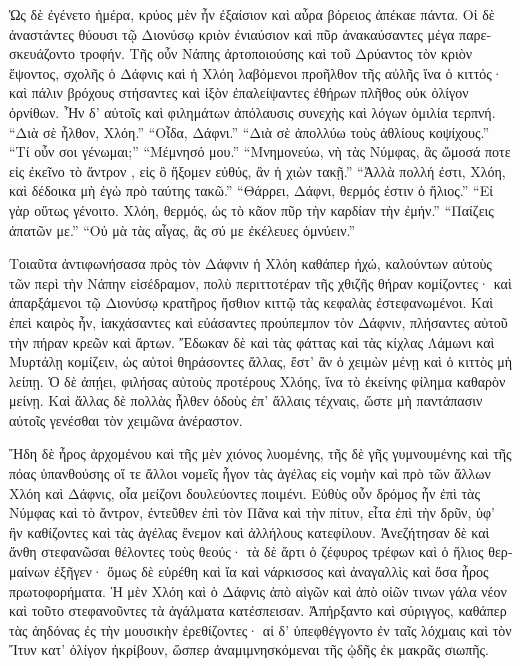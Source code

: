 \documentclass{book}
\begin{document}
\begin{pairs}
\begin{Leftside}
\begin{greek}
  Ὡς δὲ ἐγένετο ἡμέρα, κρύος μὲν ἦν ἐξαίσιον καὶ αὖρα βόρειος ἀπέκαε πάντα. Οἱ δὲ ἀναστάντες θύουσι τῷ Διονύσῳ κριὸν ἐνιαύσιον καὶ πῦρ ἀνακαύσαντες μέγα παρεσκευάζοντο τροφήν.  Τῆς οὖν Νάπης ἀρτοποιούσης καὶ τοῦ Δρύαντος τὸν κριὸν ἕψοντος, σχολῆς ὁ Δάφνις καὶ ἡ Χλόη λαβόμενοι προῆλθον τῆς αὐλῆς ἵνα ὁ κιττός· καὶ πάλιν βρόχους στήσαντες καὶ ἰξὸν ἐπαλείψαντες ἐθήρων πλῆθος οὐκ ὀλίγον ὀρνίθων.  Ἦν δ’ αὐτοῖς καὶ φιλημάτων ἀπόλαυσις συνεχὴς καὶ λόγων ὁμιλία τερπνή. “Διὰ σὲ ἦλθον, Χλόη.” “Οἶδα, Δάφνι.” “Διὰ σὲ ἀπολλύω τοὺς ἀθλίους κοψίχους.” “Τί οὖν σοι γένωμαι;” “Μέμνησό μου.” “Μνημονεύω, νὴ τὰς Νύμφας, ἃς ὤμοσά ποτε εἰς ἐκεῖνο τὸ ἄντρον , εἰς ὃ ἥξομεν εὐθύς, ἂν ἡ χιὼν τακῇ.”  “Ἀλλὰ πολλή ἐστι, Χλόη, καὶ δέδοικα μὴ ἐγὼ πρὸ ταύτης τακῶ.” “Θάρρει, Δάφνι, θερμός ἐστιν ὁ ἥλιος.” “Εἰ γὰρ οὕτως γένοιτο. Χλόη, θερμός, ὡς τὸ κᾶον πῦρ τὴν καρδίαν τὴν ἐμήν.” “Παίζεις ἀπατῶν με.” “Οὐ μὰ τὰς αἶγας, ἃς σύ με ἐκέλευες ὀμνύειν.”
\pend


  Τοιαῦτα ἀντιφωνήσασα πρὸς τὸν Δάφνιν ἡ Χλόη καθάπερ ἠχώ, καλούντων αὐτοὺς τῶν περὶ τὴν Νάπην εἰσέδραμον, πολὺ περιττοτέραν τῆς χθιζῆς θήραν κομίζοντες· καὶ ἀπαρξάμενοι τῷ Διονύσῳ κρατῆρος ἤσθιον κιττῷ τὰς κεφαλὰς ἐστεφανωμένοι.  Καὶ ἐπεὶ καιρὸς ἦν, ἰακχάσαντες καὶ εὐάσαντες προύπεμπον τὸν Δάφνιν, πλήσαντες αὐτοῦ τὴν πήραν κρεῶν καὶ ἄρτων. Ἔδωκαν δὲ καὶ τὰς φάττας καὶ τὰς κίχλας Λάμωνι καὶ Μυρτάλῃ κομίζειν, ὡς αὐτοὶ θηράσοντες ἄλλας, ἔστ’ ἂν ὁ χειμὼν μένῃ καὶ ὁ κιττὸς μὴ λείπῃ.  Ὁ δὲ ἀπῄει, φιλήσας αὐτοὺς προτέρους Χλόης, ἵνα τὸ ἐκείνης φίλημα καθαρὸν μείνῃ. Καὶ ἄλλας δὲ πολλὰς ἦλθεν ὁδοὺς ἐπ’ ἄλλαις τέχναις, ὥστε μὴ παντάπασιν αὐτοῖς γενέσθαι τὸν χειμῶνα ἀνέραστον.
\pend


  Ἤδη δὲ ἦρος ἀρχομένου καὶ τῆς μὲν χιόνος λυομένης, τῆς δὲ γῆς γυμνουμένης καὶ τῆς πόας ὑπανθούσης οἵ τε ἄλλοι νομεῖς ἦγον τὰς ἀγέλας εἰς νομὴν καὶ πρὸ τῶν ἄλλων Χλόη καὶ Δάφνις, οἷα μείζονι δουλεύοντες ποιμένι.  Εὐθὺς οὖν δρόμος ἦν ἐπὶ τὰς Νύμφας καὶ τὸ ἄντρον, ἐντεῦθεν ἐπὶ τὸν Πᾶνα καὶ τὴν πίτυν, εἶτα ἐπὶ τὴν δρῦν, ὑφ’ ἣν καθίζοντες καὶ τὰς ἀγέλας ἔνεμον καὶ ἀλλήλους κατεφίλουν. Ἀνεζήτησαν δὲ καὶ ἄνθη στεφανῶσαι θέλοντες τοὺς θεούς· τὰ δὲ ἄρτι ὁ ζέφυρος τρέφων καὶ ὁ ἥλιος θερμαίνων ἐξῆγεν· ὅμως δὲ εὑρέθη καὶ ἴα καὶ νάρκισσος καὶ ἀναγαλλὶς καὶ ὅσα ἦρος πρωτοφορήματα.  Ἡ μὲν Χλόη καὶ ὁ Δάφνις ἀπὸ αἰγῶν καὶ ἀπὸ οἰῶν τινων γάλα νέον καὶ τοῦτο στεφανοῦντες τὰ ἀγάλματα κατέσπεισαν.  Ἀπήρξαντο καὶ σύριγγος, καθάπερ τὰς ἀηδόνας ἐς τὴν μουσικὴν ἐρεθίζοντες· αἱ δ’ ὑπεφθέγγοντο ἐν ταῖς λόχμαις καὶ τὸν Ἴτυν κατ’ ὀλίγον ἠκρίβουν, ὥσπερ ἀναμιμνησκόμεναι τῆς ᾠδῆς ἐκ μακρᾶς σιωπῆς.
\pend



\end{greek}
\end{Leftside}
\end{pairs}
\end{document}
